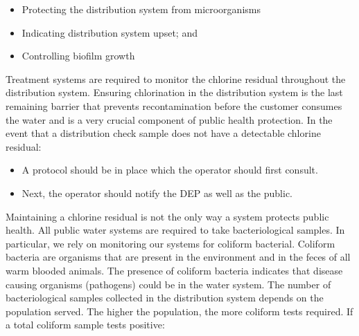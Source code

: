 \documentclass[10pt]{article}
\begin{document}
\begin{itemize}
  \item Protecting the distribution system from microorganisms

  \item Indicating distribution system upset; and

  \item Controlling biofilm growth

\end{itemize}
Treatment systems are required to monitor the chlorine residual throughout the distribution system. Ensuring chlorination in the distribution system is the last remaining barrier that prevents recontamination before the customer consumes the water and is a very crucial component of public health protection. In the event that a distribution check sample does not have a detectable chlorine residual:

\begin{itemize}
  \item A protocol should be in place which the operator should first consult.

  \item Next, the operator should notify the DEP as well as the public.

\end{itemize}
Maintaining a chlorine residual is not the only way a system protects public health. All public water systems are required to take bacteriological samples. In particular, we rely on monitoring our systems for coliform bacterial. Coliform bacteria are organisms that are present in the environment and in the feces of all warm blooded animals. The presence of coliform bacteria indicates that disease causing organisms (pathogens) could be in the water system. The number of bacteriological samples collected in the distribution system depends on the population served. The higher the population, the more coliform tests required. If a total coliform sample tests positive:
\end{document}
